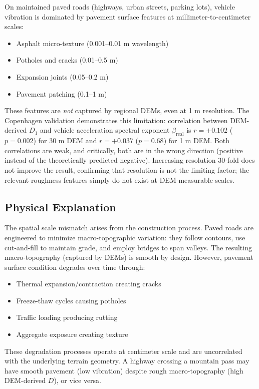 \documentclass[11pt]{article}
\begin{document}
On maintained paved roads (highways, urban streets, parking lots), vehicle vibration is dominated by pavement surface features at millimeter-to-centimeter scales:
\begin{itemize}
\item Asphalt micro-texture (0.001--0.01 m wavelength)
\item Potholes and cracks (0.01--0.5 m)
\item Expansion joints (0.05--0.2 m)
\item Pavement patching (0.1--1 m)
\end{itemize}

These features are \textit{not} captured by regional DEMs, even at 1 m resolution. The Copenhagen validation demonstrates this limitation: correlation between DEM-derived $D_1$ and vehicle acceleration spectral exponent $\beta_{\text{real}}$ is $r = +0.102$ ($p = 0.002$) for 30 m DEM and $r = +0.037$ ($p = 0.68$) for 1 m DEM. Both correlations are weak, and critically, both are in the wrong direction (positive instead of the theoretically predicted negative). Increasing resolution 30-fold does not improve the result, confirming that resolution is not the limiting factor; the relevant roughness features simply do not exist at DEM-measurable scales.

\subsection{Physical Explanation}

The spatial scale mismatch arises from the construction process. Paved roads are engineered to minimize macro-topographic variation: they follow contours, use cut-and-fill to maintain grade, and employ bridges to span valleys. The resulting macro-topography (captured by DEMs) is smooth by design. However, pavement surface condition degrades over time through:
\begin{itemize}
\item Thermal expansion/contraction creating cracks
\item Freeze-thaw cycles causing potholes
\item Traffic loading producing rutting
\item Aggregate exposure creating texture
\end{itemize}

These degradation processes operate at centimeter scale and are uncorrelated with the underlying terrain geometry. A highway crossing a mountain pass may have smooth pavement (low vibration) despite rough macro-topography (high DEM-derived $D$), or vice versa.
\end{document}
